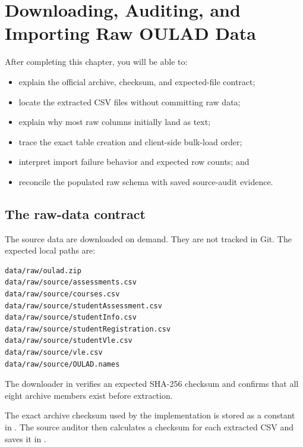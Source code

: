 \chapter{Downloading, Auditing, and Importing Raw OULAD Data}
\label{ch:raw-import}

\begin{learningobjectives}
After completing this chapter, you will be able to:
\begin{itemize}
  \item explain the official archive, checksum, and expected-file contract;
  \item locate the extracted CSV files without committing raw data;
  \item explain why most raw columns initially land as text;
  \item trace the exact table creation and client-side bulk-load order;
  \item interpret import failure behavior and expected row counts; and
  \item reconcile the populated raw schema with saved source-audit evidence.
\end{itemize}
\end{learningobjectives}

\section{The raw-data contract}

The source data are downloaded on demand. They are not tracked in Git. The
expected local paths are:

\begin{lstlisting}
data/raw/oulad.zip
data/raw/source/assessments.csv
data/raw/source/courses.csv
data/raw/source/studentAssessment.csv
data/raw/source/studentInfo.csv
data/raw/source/studentRegistration.csv
data/raw/source/studentVle.csv
data/raw/source/vle.csv
data/raw/source/OULAD.names
\end{lstlisting}

The downloader in  verifies an
expected SHA-256 checksum and confirms that all eight archive members exist
before extraction.

\begin{projectconnection}
The exact archive checksum used by the implementation is stored as a constant
in . The source auditor then calculates a checksum for
each extracted CSV and saves it in
.
\end{projectconnection}

